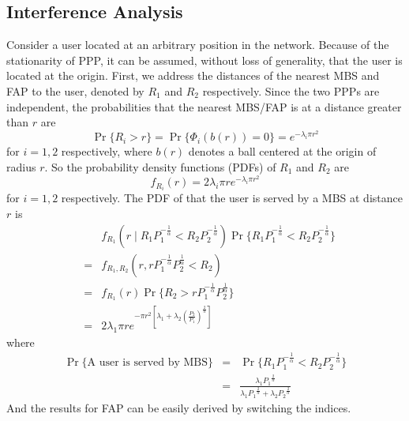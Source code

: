 \documentclass[a4paper,twocolumn]{IEEEtran}
\begin{document}
\subsection{Interference Analysis}
Consider a user located at an arbitrary position in the network. Because of the stationarity of PPP, it can be assumed, without loss of generality, that the user is located at the origin.
First, we address the distances of the nearest MBS and FAP to the user, denoted by $R_1$ and $R_2$ respectively. Since the two PPPs are independent, the probabilities that the nearest MBS/FAP is at a distance greater than $r$ are
\begin{displaymath}
\Pr\{ R_i > r \} = \Pr\{ \Phi_i(b(r)) =0\} = e^{-\lambda_i \pi r^2}
\end{displaymath}
for $i=1,2$ respectively, where $b(r)$ denotes a ball centered at the origin of radius $r$. So the probability density functions (PDFs) of $R_1$ and $R_2$ are
\begin{equation}
f_{R_i}(r) = 2\lambda_i \pi r e^{-\lambda_i \pi r^2}
\end{equation}
for $i=1,2$ respectively. The PDF of that the user is served by a MBS at distance $r$ is
\begin{eqnarray}\label{Eq:distance_dist}
&&f_{R_1}(r\mid R_1 P_1^{-\frac{1}{\alpha}} < R_2 P_2^{-\frac{1}{\alpha}}) \Pr\{R_1 P_1^{-\frac{1}{\alpha}} < R_2 P_2^{-\frac{1}{\alpha}}\}\nonumber\\
&=&f_{R_1,R_2}(r, r P_1^{-\frac{1}{\alpha}} P_2^{\frac{1}{\alpha}} < R_2)\nonumber\\
&=&f_{R_1}(r) \Pr\{ R_2 > r P_1^{-\frac{1}{\alpha}} P_2^{\frac{1}{\alpha}} \} \nonumber\\
&=&2\lambda_1 \pi r e^{- \pi r^2 [ \lambda_1 + \lambda_2 (\frac{P_2}{P_1})^\frac{2}{\alpha} ] }
\end{eqnarray}
where
\begin{eqnarray}\label{Eq:Prob_Serv}
\Pr\{\text{A user is served by MBS}\}&=&\Pr\{R_1 P_1^{-\frac{1}{\alpha}} < R_2 P_2^{-\frac{1}{\alpha}}\}\nonumber\\
&=&\frac{\lambda_1 {P_1}^\frac{2}{\alpha}}{\lambda_1 {P_1}^\frac{2}{\alpha} + \lambda_2 {P_2}^\frac{2}{\alpha}}
\end{eqnarray} 
And the results for FAP can be easily derived by switching the indices.
\end{document}

